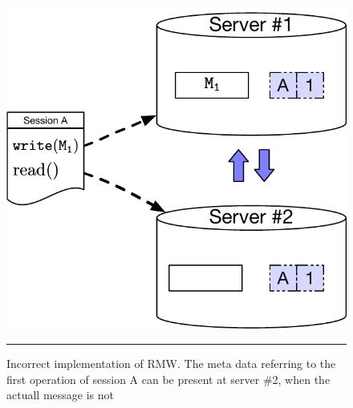 \begin{figure}
	\centering
	\includegraphics[scale = 0.4]{Figures/metadatapresent.pdf}
\vspace{1 mm} 
\hrule
\caption{Incorrect implementation of RMW. The meta data referring to the
first operation of session A can be present at server \#2, when the
actuall message is not}
\end{figure}
